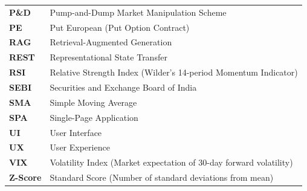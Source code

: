 \begin{longtable}{@{}p{3.0cm}p{11.5cm}@{}}
\textbf{P\&D} & Pump-and-Dump Market Manipulation Scheme \\
\textbf{PE} & Put European (Put Option Contract) \\
\textbf{RAG} & Retrieval-Augmented Generation \\
\textbf{REST} & Representational State Transfer \\
\textbf{RSI} & Relative Strength Index (Wilder's 14-period Momentum Indicator) \\
\textbf{SEBI} & Securities and Exchange Board of India \\
\textbf{SMA} & Simple Moving Average \\
\textbf{SPA} & Single-Page Application \\
\textbf{UI} & User Interface \\
\textbf{UX} & User Experience \\
\textbf{VIX} & Volatility Index (Market expectation of 30-day forward volatility) \\
\textbf{Z-Score} & Standard Score (Number of standard deviations from mean) \\
\end{longtable}

\newpage
